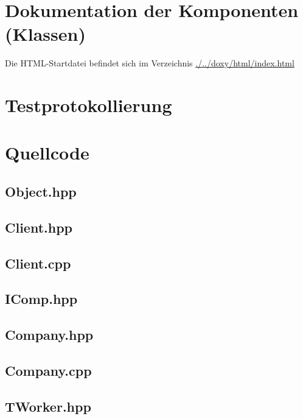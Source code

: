 \documentclass[12pt,naustrian,a4widepaper]{scrartcl}
\begin{document}
\color{black}

\section{Dokumentation der Komponenten (Klassen)}
Die HTML-Startdatei befindet sich im Verzeichnis \href{run:./../doxy/html/index.html}{./../doxy/html/index.html}


\clearpage
\section{Testprotokollierung}
%

\clearpage
\section{Quellcode}

\subsection{Object.hpp}


\subsection{Client.hpp}

\subsection{Client.cpp}


\subsection{IComp.hpp}


\subsection{Company.hpp}

\subsection{Company.cpp}


\subsection{TWorker.hpp}

\end{document}
